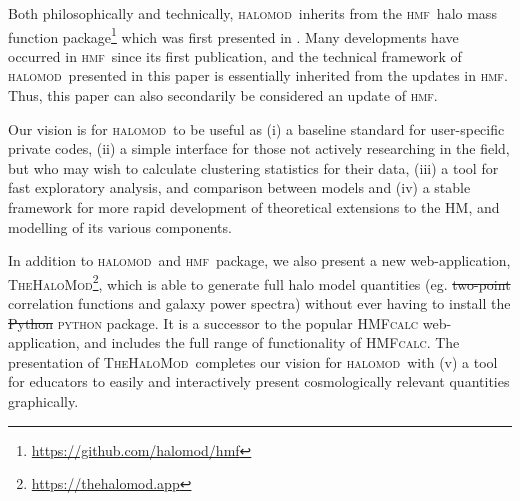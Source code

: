 \documentclass[5p,aas_macros]{elsarticle}
\newcommand{\halomod}{\textsc{halomod}\xspace} %
\newcommand{\python}{\textsc{python}\xspace} %
\newcommand{\thm}{\textsc{TheHaloMod}\xspace} %
\newcommand{\hmf}{\textsc{hmf}\xspace} %
\newcommand{\bd}[1]{\textcolor{purple}{\textbf{[BD: #1]}}}
\providecommand{\DIFaddtex}[1]{{\protect\color{blue}\uwave{#1}}} %
\providecommand{\DIFdeltex}[1]{{\protect\color{red}\sout{#1}}}                      %
\providecommand{\DIFaddbegin}{} %
\providecommand{\DIFaddend}{} %
\providecommand{\DIFdelbegin}{} %
\providecommand{\DIFdelend}{} %
\providecommand{\DIFadd}[1]{\texorpdfstring{\DIFaddtex{#1}}{#1}} %
\providecommand{\DIFdel}[1]{\texorpdfstring{\DIFdeltex{#1}}{}} %
\begin{document}
Both philosophically and technically, \halomod\ inherits from the \hmf\ halo mass function package\footnote{\DIFdelbegin %
\DIFdelend \DIFaddbegin \url{https://github.com/halomod/hmf}\DIFaddend } which was first presented in \cite{Murray2013a}.
Many developments have occurred in \hmf\ since its first publication, and the technical framework of \halomod\ presented in this paper is essentially inherited from the updates in \hmf. 
Thus, this paper can also secondarily be considered an update of \hmf.

Our vision is for \halomod\  to be useful as 
(i) a baseline standard for user-specific private codes, 
(ii) a simple interface for those not actively researching in the field, but who may wish to calculate clustering statistics for their data, 
(iii) a tool for fast exploratory analysis, and comparison between models and 
(iv) a stable framework for more rapid development of theoretical extensions to the HM, and modelling of its various components. 



In addition to \halomod\ and \hmf\ package, we also present a new web-application, \thm\footnote{\url{ https://thehalomod.app}}, which is able to generate full halo model quantities (eg. \DIFdelbegin \DIFdel{two-point }\DIFdelend \DIFaddbegin \DIFadd{2-point }\DIFaddend correlation functions and galaxy power spectra) without ever having to install the \DIFdelbegin \DIFdel{Python }\DIFdelend \DIFaddbegin \python \DIFaddend package.
It is a successor to the popular \textsc{HMFcalc} \citep{Murray2013a} web-application, and includes the full range of functionality of \textsc{HMFcalc}.
The presentation of \thm\ completes our vision for \halomod\ with (v) a tool for educators to easily and interactively present cosmologically relevant quantities graphically.
\end{document}
